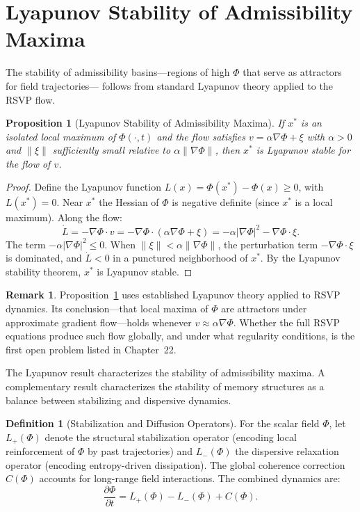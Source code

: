 \documentclass[12pt, oneside]{book}
\theoremstyle{flyxion}
\newtheorem{proposition}[theorem]{Proposition}
\theoremstyle{definition}
\newtheorem{definition}[theorem]{Definition}
\newtheorem{remark}[theorem]{Remark}
\begin{document}
\section{Lyapunov Stability of Admissibility Maxima}

The stability of admissibility basins---regions of high
$\Phi$ that serve as attractors for field trajectories---
follows from standard Lyapunov theory applied to the
RSVP flow.

\begin{proposition}[Lyapunov Stability of Admissibility Maxima]
\label{prop:lyapunov}
If $x^*$ is an isolated local maximum of $\Phi(\cdot, t)$
and the flow satisfies $v = \alpha\nabla\Phi + \xi$ with
$\alpha > 0$ and $\|\xi\|$ sufficiently small relative
to $\alpha\|\nabla\Phi\|$, then $x^*$ is Lyapunov stable
for the flow of $v$.
\end{proposition}

\begin{proof}
Define the Lyapunov function $L(x) = \Phi(x^*) - \Phi(x)
\geq 0$, with $L(x^*) = 0$. Near $x^*$ the Hessian of
$\Phi$ is negative definite (since $x^*$ is a local
maximum). Along the flow:
\[
\dot{L} = -\nabla\Phi \cdot v = -\nabla\Phi \cdot
(\alpha\nabla\Phi + \xi) = -\alpha|\nabla\Phi|^2 -
\nabla\Phi \cdot \xi.
\]
The term $-\alpha|\nabla\Phi|^2 \leq 0$. When
$\|\xi\| < \alpha\|\nabla\Phi\|$, the perturbation term
$-\nabla\Phi \cdot \xi$ is dominated, and $\dot{L} < 0$
in a punctured neighborhood of $x^*$. By the Lyapunov
stability theorem, $x^*$ is Lyapunov stable.
\end{proof}

\begin{remark}
Proposition~\ref{prop:lyapunov} uses established Lyapunov
theory applied to RSVP dynamics. Its conclusion---that
local maxima of $\Phi$ are attractors under approximate
gradient flow---holds whenever $v \approx \alpha\nabla\Phi$.
Whether the full RSVP equations produce such flow
globally, and under what regularity conditions, is the
first open problem listed in Chapter~22.
\end{remark}

The Lyapunov result characterizes the stability of admissibility
maxima. A complementary result characterizes the stability of
memory structures as a balance between stabilizing and dispersive
dynamics.

\begin{definition}[Stabilization and Diffusion Operators]
For the scalar field $\Phi$, let $L_+(\Phi)$ denote the
structural stabilization operator (encoding local reinforcement
of $\Phi$ by past trajectories) and $L_-(\Phi)$ the dispersive
relaxation operator (encoding entropy-driven dissipation). The
global coherence correction $C(\Phi)$ accounts for long-range
field interactions. The combined dynamics are:
\[
\frac{\partial \Phi}{\partial t} = L_+(\Phi) - L_-(\Phi)
+ C(\Phi).
\]
\end{definition}
\end{document}
